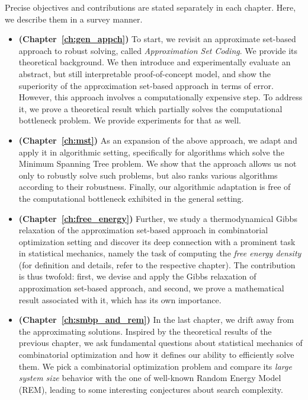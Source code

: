 Precise objectives and contributions are stated separately in each chapter.
Here, we describe them in a survey manner.
\begin{itemize}
    \item {\sffamily\bfseries (Chapter~\ref{ch:gen_appch})}
    To start, we revisit an approximate set-based approach to robust solving, called
    \textit{Approximation Set Coding}. We provide its theoretical background. We
    then introduce and experimentally evaluate an abstract, but still
    interpretable proof-of-concept model, and show the superiority of the
    approximation set-based approach in terms of error. However, this approach
    involves a computationally expensive step. To address it, we prove a
    theoretical result which partially solves the computational bottleneck
    problem. We provide experiments for that as well.
    \item {\sffamily\bfseries (Chapter~\ref{ch:mst})}
    As an expansion of the above approach, we adapt and apply it in algorithmic
    setting, specifically for algorithms which solve the Minimum Spanning Tree
    problem. We show that the approach allows us not only to robustly solve such
    problems, but also ranks various algorithms according to their robustness.
    Finally, our algorithmic adaptation is free of the computational bottleneck
    exhibited in the general setting.
    \item {\sffamily\bfseries (Chapter~\ref{ch:free_energy})} 
    Further, we study a thermodynamical Gibbs relaxation of the approximation
    set-based approach in combinatorial optimization setting and discover its
    deep connection with a prominent task in statistical mechanics, namely
    the task of computing the \textit{free energy density} (for definition
    and details, refer to the respective chapter). The contribution is thus
    twofold: first, we devise and apply the Gibbs relaxation of approximation
    set-based approach, and second, we prove a mathematical result associated
    with it, which has its own importance.
    \item {\sffamily\bfseries (Chapter~\ref{ch:smbp_and_rem})}
    In the last chapter, we drift away from the approximating solutions.
    Inspired by the theoretical results of the previous chapter, we ask
    fundamental questions about statistical mechanics of combinatorial
    optimization and how it defines our ability to efficiently solve them. We
    pick a combinatorial optimization problem and compare its \textit{large
    system size} behavior with the one of well-known Random Energy Model (REM),
    leading to some interesting conjectures about search complexity.
\end{itemize}

